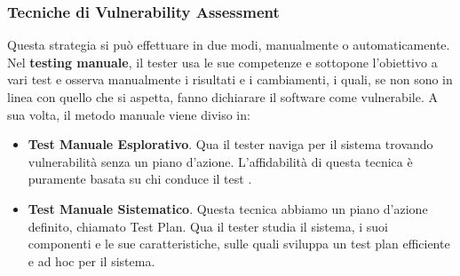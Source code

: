         \subsubsection{Tecniche di Vulnerability Assessment}
            Questa strategia si può effettuare in due modi, manualmente o automaticamente.
            Nel \textbf{testing manuale}, il tester usa le sue competenze e sottopone l'obiettivo a vari test e osserva manualmente i risultati e i cambiamenti, i quali, se non sono in linea con quello che si aspetta, fanno dichiarare il software come vulnerabile. A sua volta, il metodo manuale viene diviso in:
            \begin{itemize}
                \item \textbf{Test Manuale Esplorativo}. Qua il tester naviga per il sistema trovando vulnerabilità senza un piano d'azione. L'affidabilità di questa tecnica è puramente basata su chi conduce il test \cite{vulnerability_assessment_techniques}.
                \item \textbf{Test Manuale Sistematico}. Questa tecnica abbiamo un piano d'azione definito, chiamato Test Plan. Qua il tester studia il sistema, i suoi componenti e le sue caratteristiche, sulle quali sviluppa un test plan efficiente e ad hoc per il sistema.
            \end{itemize}

